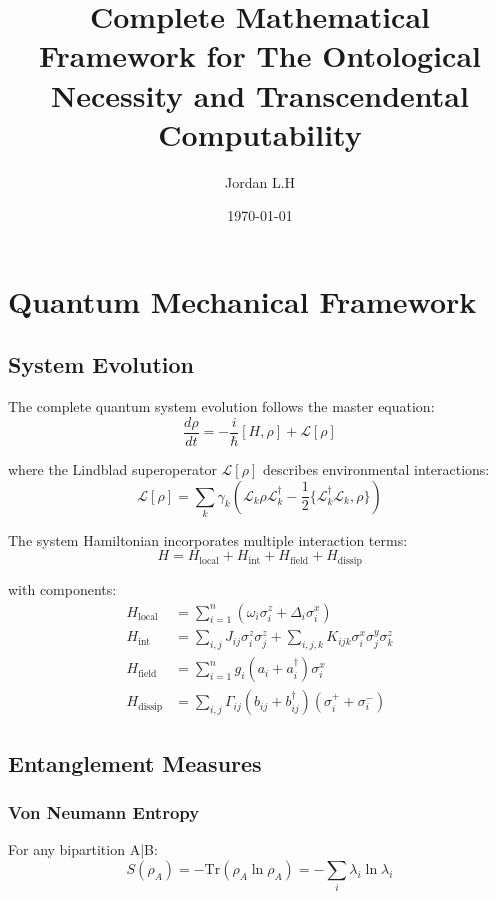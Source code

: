 \documentclass[12pt]{article}
\title{Complete Mathematical Framework for The Ontological Necessity and Transcendental Computability}
\author{Jordan L.H}
\date{\today}
\begin{document}
\maketitle

\section{Quantum Mechanical Framework}

\subsection{System Evolution}

The complete quantum system evolution follows the master equation:
\begin{equation}
    \frac{d\rho}{dt} = -\frac{i}{\hbar}[H, \rho] + \mathcal{L}[\rho]
\end{equation}

where the Lindblad superoperator $\mathcal{L}[\rho]$ describes environmental interactions:
\begin{equation}
    \mathcal{L}[\rho] = \sum_k \gamma_k\left(\mathcal{L}_k\rho\mathcal{L}_k^\dagger - \frac{1}{2}\{\mathcal{L}_k^\dagger\mathcal{L}_k, \rho\}\right)
\end{equation}

The system Hamiltonian incorporates multiple interaction terms:
\begin{equation}
    H = H_{\text{local}} + H_{\text{int}} + H_{\text{field}} + H_{\text{dissip}}
\end{equation}

with components:
\begin{align}
    H_{\text{local}} &= \sum_{i=1}^n \left(\omega_i\sigma_i^z + \Delta_i\sigma_i^x\right) \\
    H_{\text{int}} &= \sum_{i,j} J_{ij}\sigma_i^z\sigma_j^z + \sum_{i,j,k} K_{ijk}\sigma_i^x\sigma_j^y\sigma_k^z \\
    H_{\text{field}} &= \sum_{i=1}^n g_i(a_i + a_i^\dagger)\sigma_i^x \\
    H_{\text{dissip}} &= \sum_{i,j} \Gamma_{ij}(b_{ij} + b_{ij}^\dagger)(\sigma_i^+ + \sigma_i^-)
\end{align}

\subsection{Entanglement Measures}

\subsubsection{Von Neumann Entropy}
For any bipartition A|B:
\begin{equation}
    S(\rho_A) = -\text{Tr}(\rho_A\ln\rho_A) = -\sum_i \lambda_i\ln\lambda_i
\end{equation}
\end{document}
